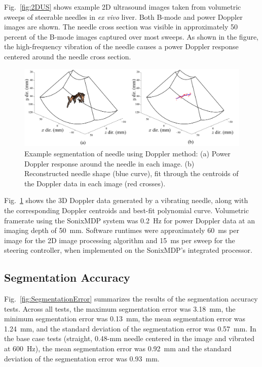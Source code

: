 \label{sec:Results}
Fig.~\ref{fig:2DUS} shows example 2D ultrasound images taken from volumetric sweeps of steerable needles in \textit{ex vivo} liver. Both B-mode and power Doppler images are shown. The needle cross section was visible in approximately 50 percent of the B-mode images captured over most sweeps. As shown in the figure, the high-frequency vibration of the needle causes a power Doppler response centered around the needle cross section.

\begin{figure}[!t]
\centering
\includegraphics[width=\textwidth]{Images/Chapter2/DopplerVisualization/Doppler3D}%
\caption[Example segmentation of needle using Doppler method]{Example segmentation of needle using Doppler method: (a) Power Doppler response around the needle in each image. (b) Reconstructed needle shape (blue curve), fit through the centroids of the Doppler data in each image (red crosses).}
\label{fig:SegmentationExample}
\end{figure}   

Fig.~\ref{fig:SegmentationExample} shows the 3D Doppler data generated by a vibrating needle, along with the corresponding Doppler centroids and best-fit polynomial curve. Volumetric framerate using the SonixMDP system was 0.2~Hz for power Doppler data at an imaging depth of 50~mm. Software runtimes were approximately 60~ms per image for the 2D image processing algorithm and 15~ms per sweep for the steering controller, when implemented on the SonixMDP's integrated processor.

\subsection{Segmentation Accuracy}
Fig.~\ref{fig:SegmentationError} summarizes the results of the segmentation accuracy tests. Across all tests, the maximum segmentation error was 3.18~mm, the minimum segmentation error was 0.13~mm, the mean segmentation error was 1.24~mm, and the standard deviation of the segmentation error was 0.57~mm. In the base case tests (straight, 0.48-mm needle centered in the image and vibrated at 600~Hz), the mean segmentation error was 0.92~mm and the standard deviation of the segmentation error was 0.93~mm.

